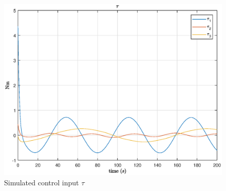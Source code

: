 \begin{figure}[h!]
    \centering
    \includegraphics[scale=0.7]{tau3.eps}
    \caption{Simulated control input $\tau$}
    \label{fig:tau3}
\end{figure}



